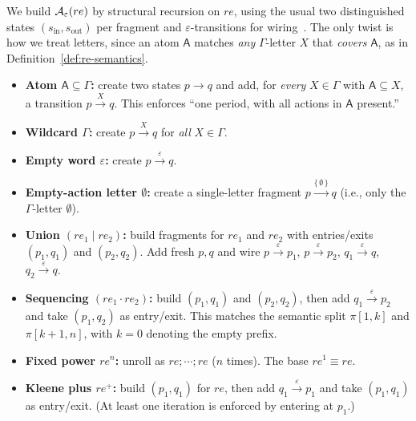 We build $\mathcal{A}_{\varepsilon}(re)$ by structural recursion on $re$, using the
usual two distinguished states $(s_{\mathrm{in}},s_{\mathrm{out}})$ per fragment
and $\varepsilon$-transitions for wiring~\cite{Thompson1968,HopcroftUllman2001,Sipser2012}. The only twist is how we
treat letters, since an atom $\mathsf{A}$ matches \emph{any} $\Gamma$-letter $X$
that \emph{covers} $\mathsf{A}$, as in Definition~\ref{def:re-semantics}.

\begin{itemize}

  \item \textbf{Atom $\mathsf{A}\subseteq\Gamma$:} create two states
$p\to q$ and add, for \emph{every} $X\in\Gamma$ with $\mathsf{A}\subseteq X$,
a transition $p \xrightarrow{X} q$.
This enforces ``one period, with all actions in $\mathsf{A}$ present.''


  \item \textbf{Wildcard $\Gamma$:} create $p\xrightarrow{X} q$ for \emph{all} $X\in\Gamma$.



  \item \textbf{Empty word $\varepsilon$:} create $p \xrightarrow{\varepsilon} q$.



  \item \textbf{Empty-action letter $\emptyset$:} create a single-letter fragment
$p \xrightarrow{\{\,\emptyset\,\}} q$ (i.e., only the $\Gamma$-letter $\emptyset$).

  \item \textbf{Union $(re_1 \mid re_2)$:} build fragments for $re_1$ and $re_2$ with
  entries/exits $(p_1,q_1)$ and $(p_2,q_2)$. Add fresh $p,q$ and wire
  $p \xrightarrow{\varepsilon} p_1$, $p \xrightarrow{\varepsilon} p_2$,
  $q_1 \xrightarrow{\varepsilon} q$, $q_2 \xrightarrow{\varepsilon} q$.



  \item \textbf{Sequencing $(re_1 \cdot re_2)$:} build $(p_1,q_1)$ and $(p_2,q_2)$, then
        add $q_1 \xrightarrow{\varepsilon} p_2$ and take $(p_1,q_2)$ as entry/exit.
        This matches the semantic split $\pi[1,k]$ and $\pi[k+1,n]$, with $k=0$ denoting the empty prefix.



  \item \textbf{Fixed power $re^n$:} unroll as $re;\cdots;re$ ($n$ times). The base
        $re^1\equiv re$.
  \item \textbf{Kleene plus $re^+$:} build $(p_1,q_1)$ for $re$, then add
        $q_1 \xrightarrow{\varepsilon} p_1$ and take $(p_1,q_1)$ as entry/exit.
        (At least one iteration is enforced by entering at $p_1$.)
\end{itemize}

